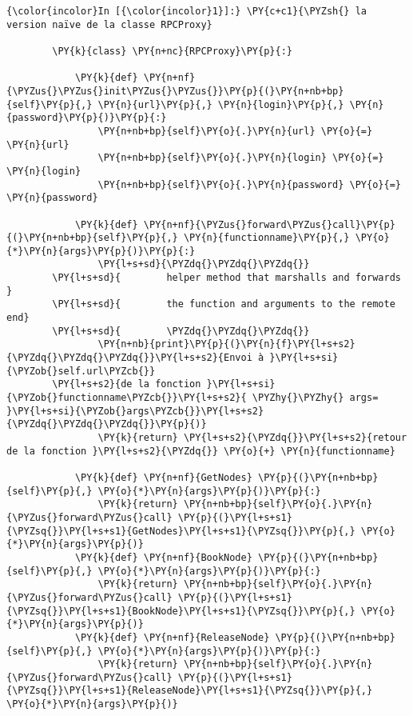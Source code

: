     \begin{Verbatim}[commandchars=\\\{\}]
{\color{incolor}In [{\color{incolor}1}]:} \PY{c+c1}{\PYZsh{} la version naïve de la classe RPCProxy}
        
        \PY{k}{class} \PY{n+nc}{RPCProxy}\PY{p}{:}
            
            \PY{k}{def} \PY{n+nf}{\PYZus{}\PYZus{}init\PYZus{}\PYZus{}}\PY{p}{(}\PY{n+nb+bp}{self}\PY{p}{,} \PY{n}{url}\PY{p}{,} \PY{n}{login}\PY{p}{,} \PY{n}{password}\PY{p}{)}\PY{p}{:}
                \PY{n+nb+bp}{self}\PY{o}{.}\PY{n}{url} \PY{o}{=} \PY{n}{url}
                \PY{n+nb+bp}{self}\PY{o}{.}\PY{n}{login} \PY{o}{=} \PY{n}{login}
                \PY{n+nb+bp}{self}\PY{o}{.}\PY{n}{password} \PY{o}{=} \PY{n}{password}
                
            \PY{k}{def} \PY{n+nf}{\PYZus{}forward\PYZus{}call}\PY{p}{(}\PY{n+nb+bp}{self}\PY{p}{,} \PY{n}{functionname}\PY{p}{,} \PY{o}{*}\PY{n}{args}\PY{p}{)}\PY{p}{:}
                \PY{l+s+sd}{\PYZdq{}\PYZdq{}\PYZdq{}}
        \PY{l+s+sd}{        helper method that marshalls and forwards }
        \PY{l+s+sd}{        the function and arguments to the remote end}
        \PY{l+s+sd}{        \PYZdq{}\PYZdq{}\PYZdq{}}
                \PY{n+nb}{print}\PY{p}{(}\PY{n}{f}\PY{l+s+s2}{\PYZdq{}\PYZdq{}\PYZdq{}}\PY{l+s+s2}{Envoi à }\PY{l+s+si}{\PYZob{}self.url\PYZcb{}}
        \PY{l+s+s2}{de la fonction }\PY{l+s+si}{\PYZob{}functionname\PYZcb{}}\PY{l+s+s2}{ \PYZhy{}\PYZhy{} args= }\PY{l+s+si}{\PYZob{}args\PYZcb{}}\PY{l+s+s2}{\PYZdq{}\PYZdq{}\PYZdq{}}\PY{p}{)}
                \PY{k}{return} \PY{l+s+s2}{\PYZdq{}}\PY{l+s+s2}{retour de la fonction }\PY{l+s+s2}{\PYZdq{}} \PY{o}{+} \PY{n}{functionname}
            
            \PY{k}{def} \PY{n+nf}{GetNodes} \PY{p}{(}\PY{n+nb+bp}{self}\PY{p}{,} \PY{o}{*}\PY{n}{args}\PY{p}{)}\PY{p}{:}
                \PY{k}{return} \PY{n+nb+bp}{self}\PY{o}{.}\PY{n}{\PYZus{}forward\PYZus{}call} \PY{p}{(}\PY{l+s+s1}{\PYZsq{}}\PY{l+s+s1}{GetNodes}\PY{l+s+s1}{\PYZsq{}}\PY{p}{,} \PY{o}{*}\PY{n}{args}\PY{p}{)}
            \PY{k}{def} \PY{n+nf}{BookNode} \PY{p}{(}\PY{n+nb+bp}{self}\PY{p}{,} \PY{o}{*}\PY{n}{args}\PY{p}{)}\PY{p}{:}
                \PY{k}{return} \PY{n+nb+bp}{self}\PY{o}{.}\PY{n}{\PYZus{}forward\PYZus{}call} \PY{p}{(}\PY{l+s+s1}{\PYZsq{}}\PY{l+s+s1}{BookNode}\PY{l+s+s1}{\PYZsq{}}\PY{p}{,} \PY{o}{*}\PY{n}{args}\PY{p}{)}
            \PY{k}{def} \PY{n+nf}{ReleaseNode} \PY{p}{(}\PY{n+nb+bp}{self}\PY{p}{,} \PY{o}{*}\PY{n}{args}\PY{p}{)}\PY{p}{:}
                \PY{k}{return} \PY{n+nb+bp}{self}\PY{o}{.}\PY{n}{\PYZus{}forward\PYZus{}call} \PY{p}{(}\PY{l+s+s1}{\PYZsq{}}\PY{l+s+s1}{ReleaseNode}\PY{l+s+s1}{\PYZsq{}}\PY{p}{,} \PY{o}{*}\PY{n}{args}\PY{p}{)}
\end{Verbatim}


